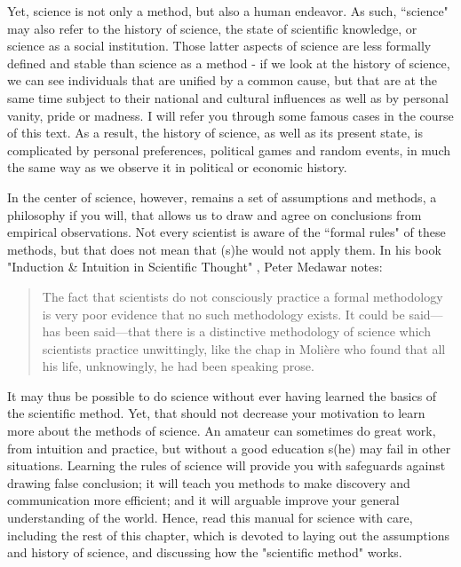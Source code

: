 \documentclass{tufte-book}
\begin{document}
Yet, science is not only a method, but also a human endeavor. As such, ``science" may also refer to the history of science, the state of scientific knowledge, or science as a social institution. Those latter aspects of science are less formally defined and stable than science as a method - if we look at the history of science, we can see individuals that are unified by a common cause, but that are at the same time subject to their national and cultural influences as well as by personal vanity, pride or madness. I will refer you through some famous cases in the course of this text. As a result, the history of science, as well as its present state, is complicated by personal preferences, political games and random events, in much the same way as we observe it in political or economic history. 

In the center of science, however, remains a set of assumptions and methods, a philosophy if you will, that allows us to draw and agree on conclusions from empirical observations. Not every scientist is aware of the ``formal rules" of these methods, but that does not mean that (s)he would not apply them. In his book "Induction \& Intuition in Scientific Thought" \citep{Medawar-Inductionintuitionscientific-2013}, Peter Medawar notes: 

\begin{quote}
The fact that scientists do not consciously practice a formal methodology is very poor evidence that no such methodology exists. It could be said—has been said—that there is a distinctive methodology of science which scientists practice unwittingly, like the chap in Molière who found that all his life, unknowingly, he had been speaking prose.
\end{quote}

It may thus be possible to do science without ever having learned the basics of the scientific method. Yet, that should not decrease your motivation to learn more about the methods of science. An amateur can sometimes do great work, from intuition and practice, but without a good education s(he) may fail in other situations. Learning the rules of science will provide you with safeguards against drawing false conclusion; it will teach you methods to make discovery and communication more efficient; and it will arguable improve your general understanding of the world. Hence, read this manual for science with care, including the  rest of this chapter, which is devoted to laying out the assumptions and history of science, and discussing how the "scientific method" works. 
\end{document}
